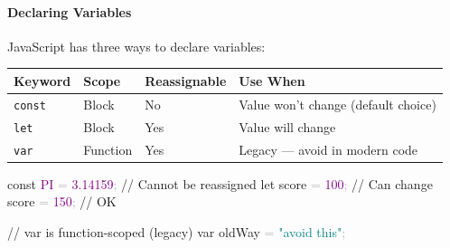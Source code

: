 \documentclass[
  justified,
  openright,
]{tufte-book}
\let\subsubsection\paragraph
\let\paragraph\paragraph
\newcommand{\CommentTok}[1]{\textcolor{MidGray}{#1}}
\newcommand{\ConstantTok}[1]{\textcolor{Purple}{#1}}
\newcommand{\DecValTok}[1]{\textcolor{Purple}{#1}}
\newcommand{\FloatTok}[1]{\textcolor{Purple}{#1}}
\newcommand{\KeywordTok}[1]{\textcolor{BrandBlue}{#1}}
\newcommand{\NormalTok}[1]{#1}
\newcommand{\OperatorTok}[1]{\textcolor{DarkGray}{#1}}
\newcommand{\StringTok}[1]{\textcolor{Teal}{#1}}
\newenvironment{Shaded}{%
  \begin{snugshade}
}{%
  \end{snugshade}
}
\let\subsubsection\paragraph
\let\paragraph\paragraph
\begin{document}
\subsubsection{Declaring Variables}\label{declaring-variables}

JavaScript has three ways to declare variables:

{\def\LTcaptype{none} %
\begin{longtable}[]{@{}
  >{\raggedright\arraybackslash}p{}
  >{\raggedright\arraybackslash}p{}
  >{\raggedright\arraybackslash}p{}
  >{\raggedright\arraybackslash}p{}@{}}
\toprule\noalign{}
\begin{minipage}[b]{\linewidth}\raggedright
Keyword
\end{minipage} & \begin{minipage}[b]{\linewidth}\raggedright
Scope
\end{minipage} & \begin{minipage}[b]{\linewidth}\raggedright
Reassignable
\end{minipage} & \begin{minipage}[b]{\linewidth}\raggedright
Use When
\end{minipage} \\
\midrule\noalign{}
\endhead
\bottomrule\noalign{}
\endlastfoot
\texttt{const} & Block & No & Value won't change (default choice) \\
\texttt{let} & Block & Yes & Value will change \\
\texttt{var} & Function & Yes & Legacy --- avoid in modern code \\
\end{longtable}
}

\begin{Shaded}
\begin{Highlighting}[]
\KeywordTok{const} \ConstantTok{PI} \OperatorTok{=} \FloatTok{3.14159}\OperatorTok{;} \CommentTok{// Cannot be reassigned}
\KeywordTok{let}\NormalTok{ score }\OperatorTok{=} \DecValTok{100}\OperatorTok{;} \CommentTok{// Can change}
\NormalTok{score }\OperatorTok{=} \DecValTok{150}\OperatorTok{;} \CommentTok{// OK}

\CommentTok{// var is function{-}scoped (legacy)}
\KeywordTok{var}\NormalTok{ oldWay }\OperatorTok{=} \StringTok{"avoid this"}\OperatorTok{;}
\end{Highlighting}
\end{Shaded}
\end{document}
